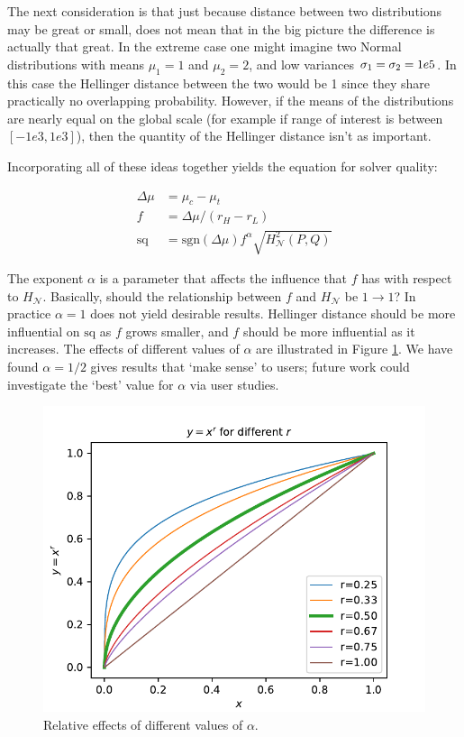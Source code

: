 The next consideration is that just because distance between two distributions may be great or small, does not mean that in the big picture the difference is actually that great. In the extreme case one might imagine two Normal distributions with means $\mu_1=1$ and $\mu_2=2$, and low variances $\sigma_1=\sigma_2=1e\-5$. In this case the Hellinger distance between the two would be 1 since they share practically no overlapping probability. However, if the means of the distributions are nearly equal on the global scale (for example if range of interest is between $[-1e3,1e3]$), then the quantity of the Hellinger distance isn't as important.

Incorporating all of these ideas together yields the equation for solver quality:

\begin{align}
    \Delta \mu &= \mu_c-\mu_t\\
    f &= \Delta \mu/(r_H-r_L) \label{eq:f}\\
    \text{sq} &= \text{sgn}(\Delta \mu)f^{\alpha}\sqrt{H_{\mathcal{N}}^{2}(P,Q)} \label{eq:sq}
\end{align}

The exponent $\alpha$ is a parameter that affects the influence that $f$ has with respect to $H_{\mathcal{N}}$. Basically, should the relationship between $f$ and $H_{\mathcal{N}}$ be $1\to1$? In practice $\alpha=1$ does not yield desirable results. Hellinger distance should be more influential on $\text{sq}$ as $f$ grows smaller, and $f$ should be more influential as it increases. The effects of different values of $\alpha$ are illustrated in Figure \ref{fig:alphas}. We have found $\alpha=1/2$ gives results that `make sense' to users; future work could investigate the `best' value for $\alpha$ via user studies.

\begin{figure}[tbp]
    \centering
    \includegraphics[width=0.9\linewidth]{Figures/power_comparison}
    \caption{Relative effects of different values of $\alpha$.}
    \label{fig:alphas}
\end{figure}

